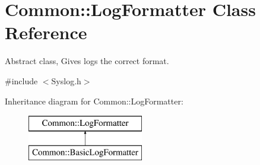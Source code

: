 \hypertarget{class_common_1_1_log_formatter}{\section{Common\-:\-:Log\-Formatter Class Reference}
\label{class_common_1_1_log_formatter}
}


Abstract class, Gives logs the correct format.  




{\ttfamily \#include $<$Syslog.\-h$>$}

Inheritance diagram for Common\-:\-:Log\-Formatter\-:\begin{figure}[H]
\begin{center}
\leavevmode
\includegraphics[height=2.000000cm]{class_common_1_1_log_formatter}
\end{center}
\end{figure}
